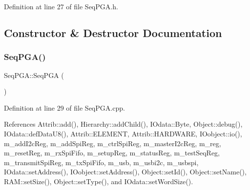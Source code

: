 Definition at line 27 of file Seq\+P\+G\+A.\+h.



\subsection{Constructor \& Destructor Documentation}
\mbox{\label{classSeqPGA_a032240de5048a496dcce57ac28e10f65}} 
\subsubsection{\texorpdfstring{Seq\+P\+G\+A()}{SeqPGA()}}
{\footnotesize\ttfamily Seq\+P\+G\+A\+::\+Seq\+P\+GA (\begin{DoxyParamCaption}{ }\end{DoxyParamCaption})}



Definition at line 29 of file Seq\+P\+G\+A.\+cpp.



References Attrib\+::add(), Hierarchy\+::add\+Child(), I\+Odata\+::\+Byte, Object\+::debug(), I\+Odata\+::def\+Data\+U8(), Attrib\+::\+E\+L\+E\+M\+E\+NT, Attrib\+::\+H\+A\+R\+D\+W\+A\+RE, I\+Oobject\+::io(), m\+\_\+add\+I2c\+Reg, m\+\_\+add\+Spi\+Reg, m\+\_\+ctrl\+Spi\+Reg, m\+\_\+master\+I2c\+Reg, m\+\_\+reg, m\+\_\+reset\+Reg, m\+\_\+rx\+Spi\+Fifo, m\+\_\+setup\+Reg, m\+\_\+status\+Reg, m\+\_\+test\+Seq\+Reg, m\+\_\+transmit\+Spi\+Reg, m\+\_\+tx\+Spi\+Fifo, m\+\_\+usb, m\+\_\+usbi2c, m\+\_\+usbspi, I\+Odata\+::set\+Address(), I\+Oobject\+::set\+Address(), Object\+::set\+Id(), Object\+::set\+Name(), R\+A\+M\+::set\+Size(), Object\+::set\+Type(), and I\+Odata\+::set\+Word\+Size().


